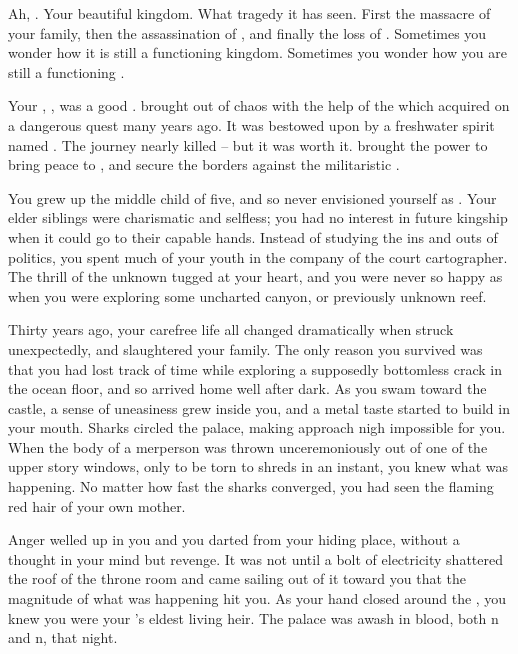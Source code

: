 \documentclass[char]{NeptuneBall}
\begin{document}
\name{\cKing{}}



Ah, \pAtlantis{}. Your beautiful kingdom. What tragedy it has seen. First the massacre of your family, then the assassination of \cQueen{\King{}} \cQueen{}, and finally the loss of \cAriel{\Prince{}} \cAriel{}. Sometimes you wonder how it is still a functioning kingdom. Sometimes you wonder how you are still a functioning \cKing{\King{}}.

Your \cExKing{\parent{}}, \cExKing{\King} \cExKing{}, was a good \cExKing{\King{}}. \cExKing{\They{}} brought \pAtlantis{} out of chaos with the help of the \iTrident{\MYname{}} which \cExKing{\they{}} acquired on a dangerous quest many years ago. It was bestowed upon \cExKing{\them{}} by a freshwater spirit named \cNixie{}. The journey nearly killed \cExKing{\them{}} -- but it was worth it. \iTrident{\MYname{}} brought \cExKing{} the power to bring peace to \pAtlantis{}, and secure the borders against the militaristic \pPacifica{}.

You grew up the middle child of five, and so never envisioned yourself as \cKing{\King{}}.  Your elder siblings were charismatic and selfless; you had no interest in future kingship when it could go to their capable hands.  Instead of studying the ins and outs of politics, you spent much of your youth in the company of the court cartographer. The thrill of the unknown tugged at your heart, and you were never so happy as when you were exploring some uncharted canyon, or previously unknown reef.

Thirty years ago, your carefree life all changed dramatically when \pPacifica{} struck unexpectedly, and slaughtered your family. The only reason you survived was that you had lost track of time while exploring a supposedly bottomless crack in the ocean floor, and so arrived home well after dark. As you swam toward the castle, a sense of uneasiness grew inside you, and a metal taste started to build in your mouth. Sharks circled the palace, making approach nigh impossible for you. When the body of a merperson was thrown unceremoniously out of one of the upper story windows, only to be torn to shreds in an instant, you knew what was happening. No matter how fast the sharks converged, you had seen the flaming red hair of your own mother.

Anger welled up in you and you darted from your hiding place, without a thought in your mind but revenge. It was not until a bolt of electricity shattered the roof of the throne room and \iTrident{\MYname{}} came sailing out of it toward you that the magnitude of what was happening hit you. As your hand closed around the \iTrident{\MYname{}}, you knew you were your \cExKing{\parent{}}'s eldest living heir. The palace was awash in blood, both \pPacifica{}n and \pAtlantis{}n, that night. 
\end{document}
